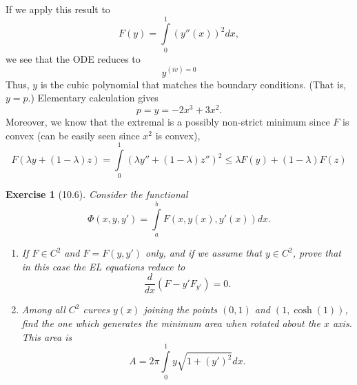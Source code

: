 \documentclass[letterpaper,twoside,11pt]{article}
\theoremstyle{mystyle}
\newtheorem*{exercise}{Exercise}
\newcommand{\cbk}{\color{black}}
\newcommand{\cblu}{\color{blue}}
\begin{document}
  If we apply this result to
  \[F(y) = \int\limits_0^1 \left( y''(x) \right)^2 dx,\]
  we see that the ODE reduces to 
  \[y^{(iv) = 0}\]
  Thus, $y$ is the cubic polynomial that matches the boundary conditions. (That is, $y = p$.) Elementary calculation gives 
  \[p = y = -2x^3 + 3x^2.\]
  Moreover, we know that the extremal is a possibly non-strict minimum since $F$ is convex (can be easily seen since $x^2$ is convex),
  \[F\left( {\lambda y + \left( {1 - \lambda } \right)z} \right) = \int\limits_0^1 {{{\left( {\lambda y'' + \left( {1 - \lambda } \right)z''} \right)}^2}}  \leqslant \lambda F\left( y \right) + \left( {1 - \lambda } \right)F\left( z \right)\]
\cbk 



\begin{exercise}[10.6]
  Consider the functional 
  \[\Phi(x, y, y') = \int\limits_a^b F(x, y(x), y'(x))dx.\]
  \begin{enumerate}
    \item If $F \in C^2$ and $F = F(y, y')$ only, and if we assume that $y \in C^2$, prove that in this case the EL equations reduce to 
    \[\frac{d}{dx}\left( F - y'F_{y'} \right) = 0.\]
    \item Among all $C^2$ curves $y(x)$ joining the points $(0,1)$ and $(1, \cosh(1))$, find the one which generates the minimum area when rotated about the $x$ axis. This area is 
    \[A = 2\pi \int\limits_0^1 y \sqrt{1 + (y')^2} dx.\]
  \end{enumerate}
\end{exercise}

\cblu 
\end{document}
